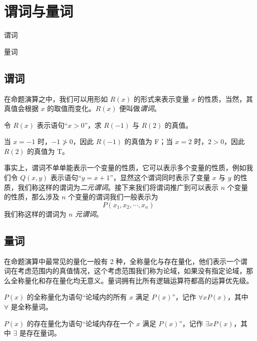 \section{谓词与量词}
\begin{introduction}
    \item 谓词
    \item 量词
\end{introduction}

\subsection{谓词}
在命题演算之中，我们可以用形如 $R(x)$ 的形式来表示变量 $x$ 的性质，当然，其真值会根据 $x$ 的取值而变化。$R(x)$ 便叫做\emph{谓词}。
\begin{collections}
    \begin{example}
        令 $R(x)$ 表示语句“$x > 0$”，求 $R(-1)$ 与 $R(2)$ 的真值。
    \end{example}
    \begin{solution}
        当 $x = -1$ 时，$-1 \ngtr 0$，因此 $R(-1)$ 的真值为 F；当 $x = 2$ 时，$2 > 0$，因此 $R(2)$ 的真值为 T。
    \end{solution}
\end{collections}

事实上，谓词不单单能表示一个变量的性质，它可以表示多个变量的性质，例如我们令 $Q(x,y)$ 表示语句“$y = x + 1$”，显然这个谓词同时表示了变量 $x$ 与 $y$ 的性质，我们称这样的谓词为\emph{二元谓词}。接下来我们将谓词推广到可以表示 $n$ 个变量的性质，那么涉及 $n$ 个变量的谓词我们一般表示为
\begin{equation*}
    P(x_1,x_2,\cdots,x_n)
\end{equation*}
我们称这样的谓词为 \emph{$n$ 元谓词}。

\subsection{量词}
在命题演算中最常见的量化一般有 2 种，全称量化与存在量化，他们表示一个谓词在考虑范围内的真值情况，这个考虑范围我们称为论域，如果没有指定论域，那么全称量化和存在量化均无意义。量词拥有比所有逻辑运算符都高的运算优先级。

\begin{definition}[全称量化]\label{def:全称量化}
    $P(x)$ 的全称量化为语句“论域内的所有 $x$ 满足 $P(x)$”，记作 $\forall x P(x)$，其中 $\forall$ 是全称量词。
\end{definition}

\begin{definition}[存在量化]\label{def:存在量化}
    $P(x)$ 的存在量化为语句“论域内存在一个 $x$ 满足 $P(x)$”，记作 $\exists x P(x)$，其中 $\exists$ 是存在量词。
\end{definition}

